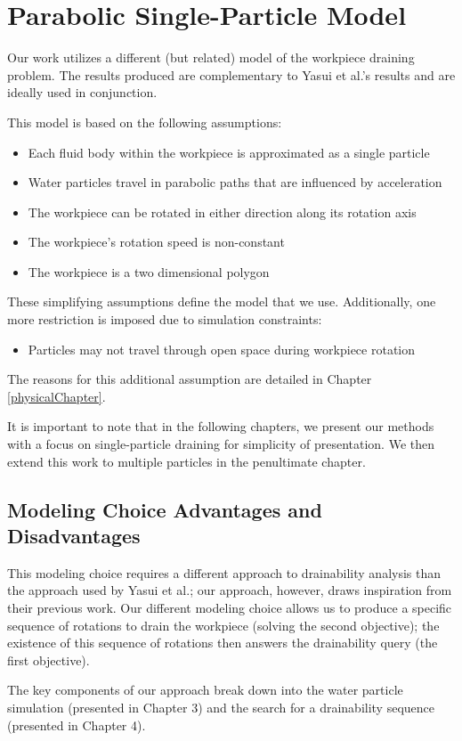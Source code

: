 \section{Parabolic Single-Particle Model}

Our work utilizes a different (but related) model of the workpiece draining problem. The results produced are complementary to Yasui et al.'s results and are ideally used in conjunction.

This model is based on the following assumptions:

\begin{itemize}
	\item Each fluid body within the workpiece is approximated as a single particle
	\item Water particles travel in parabolic paths that are influenced by acceleration
	\item The workpiece can be rotated in either direction along its rotation axis
	\item The workpiece's rotation speed is non-constant
	\item The workpiece is a two dimensional polygon
\end{itemize}

These simplifying assumptions define the model that we use. Additionally, one more restriction is imposed due to simulation constraints:

\begin{itemize}
	\item Particles may not travel through open space during workpiece rotation
\end{itemize}

The reasons for this additional assumption are detailed in Chapter \ref{physicalChapter}.

It is important to note that in the following chapters, we present our methods with a focus on single-particle draining for simplicity of presentation. We then extend this work to multiple particles in the penultimate chapter.

	\subsection{Modeling Choice Advantages and Disadvantages}

This modeling choice requires a different approach to drainability analysis than the approach used by Yasui et al.; our approach, however, draws inspiration from their previous work. Our different modeling choice allows us to produce a specific sequence of rotations to drain the workpiece (solving the second objective); the existence of this sequence of rotations then answers the drainability query (the first objective).

The key components of our approach break down into the water particle simulation (presented in Chapter 3) and the search for a drainability sequence (presented in Chapter 4).



